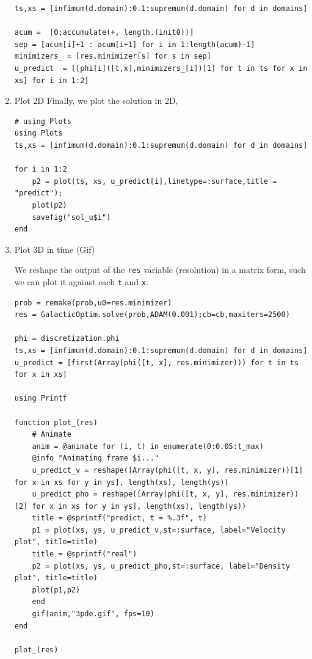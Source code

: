 \documentclass[11pt]{article}
\begin{document}
\begin{enumerate}
\begin{verbatim}
ts,xs = [infimum(d.domain):0.1:supremum(d.domain) for d in domains]

acum =  [0;accumulate(+, length.(initθ))]
sep = [acum[i]+1 : acum[i+1] for i in 1:length(acum)-1]
minimizers_ = [res.minimizer[s] for s in sep]
u_predict  = [[phi[i]([t,x],minimizers_[i])[1] for t in ts for x in xs] for i in 1:2]
\end{verbatim}

\item Plot 2D
\label{sec:orgc478cca}
Finally, we plot the solution in 2D,
\begin{verbatim}
# using Plots
using Plots
ts,xs = [infimum(d.domain):0.1:supremum(d.domain) for d in domains]

for i in 1:2
    p2 = plot(ts, xs, u_predict[i],linetype=:surface,title = "predict");
    plot(p2)
    savefig("sol_u$i")
end
\end{verbatim}

\item Plot 3D in time (Gif)
\label{sec:orgb08680b}

We reshape the output of the \texttt{res} variable (resolution) in a matrix form, such
we can plot it against each \texttt{t} and \texttt{x}.

\begin{verbatim}
prob = remake(prob,u0=res.minimizer)
res = GalacticOptim.solve(prob,ADAM(0.001);cb=cb,maxiters=2500)

phi = discretization.phi
ts,xs = [infimum(d.domain):0.1:supremum(d.domain) for d in domains]
u_predict = [first(Array(phi([t, x], res.minimizer))) for t in ts for x in xs]

using Printf

function plot_(res)
    # Animate
    anim = @animate for (i, t) in enumerate(0:0.05:t_max)
	@info "Animating frame $i..."
	u_predict_v = reshape([Array(phi([t, x, y], res.minimizer))[1] for x in xs for y in ys], length(xs), length(ys))
	u_predict_pho = reshape([Array(phi([t, x, y], res.minimizer))[2] for x in xs for y in ys], length(xs), length(ys))
	title = @sprintf("predict, t = %.3f", t)
	p1 = plot(xs, ys, u_predict_v,st=:surface, label="Velocity plot", title=title)
	title = @sprintf("real")
	p2 = plot(xs, ys, u_predict_pho,st=:surface, label="Density plot", title=title)
	plot(p1,p2)
    end
    gif(anim,"3pde.gif", fps=10)
end

plot_(res)
\end{verbatim}
\end{enumerate}
\end{document}
